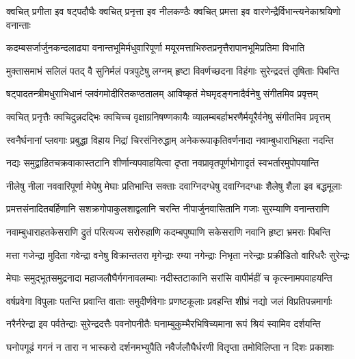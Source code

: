 \twolineshloka
{क्वचित् प्रगीता इव षट्पदौघैः क्वचित् प्रनृत्ता इव नीलकण्ठैः}
{क्वचित् प्रमत्ता इव वारणेन्द्रैर्विभान्त्यनेकाश्रयिणो वनान्ताः} %

\twolineshloka
{कदम्बसर्जार्जुनकन्दलाढ्या वनान्तभूमिर्मधुवारिपूर्णा}
{मयूरमत्ताभिरुतप्रनृत्तैरापानभूमिप्रतिमा विभाति} %

\twolineshloka
{मुक्तासमाभं सलिलं पतद् वै सुनिर्मलं पत्रपुटेषु लग्नम्}
{हृष्टा विवर्णच्छदना विहंगाः सुरेन्द्रदत्तं तृषिताः पिबन्ति} %

\twolineshloka
{षट्पादतन्त्रीमधुराभिधानं प्लवंगमोदीरितकण्ठतालम्}
{आविष्कृतं मेघमृदङ्गनादैर्वनेषु संगीतमिव प्रवृत्तम्} %

\twolineshloka
{क्वचित् प्रनृत्तैः क्वचिदुन्नदद्भिः क्वचिच्च वृक्षाग्रनिषण्णकायैः}
{व्यालम्बबर्हाभरणैर्मयूरैर्वनेषु संगीतमिव प्रवृत्तम्} %

\twolineshloka
{स्वनैर्घनानां प्लवगाः प्रबुद्धा विहाय निद्रां चिरसंनिरुद्धाम्}
{अनेकरूपाकृतिवर्णनादा नवाम्बुधाराभिहता नदन्ति} %

\twolineshloka
{नद्यः समुद्वाहितचक्रवाकास्तटानि शीर्णान्यपवाहयित्वा}
{दृप्ता नवप्रावृतपूर्णभोगादृतं स्वभर्तारमुपोपयान्ति} %

\twolineshloka
{नीलेषु नीला नववारिपूर्णा मेघेषु मेघाः प्रतिभान्ति सक्ताः}
{दवाग्निदग्धेषु दवाग्निदग्धाः शैलेषु शैला इव बद्धमूलाः} %

\twolineshloka
{प्रमत्तसंनादितबर्हिणानि सशक्रगोपाकुलशाद्वलानि}
{चरन्ति नीपार्जुनवासितानि गजाः सुरम्याणि वनान्तराणि} %

\twolineshloka
{नवाम्बुधाराहतकेसराणि द्रुतं परित्यज्य सरोरुहाणि}
{कदम्बपुष्पाणि सकेसराणि नवानि हृष्टा भ्रमराः पिबन्ति} %

\twolineshloka
{मत्ता गजेन्द्रा मुदिता गवेन्द्रा वनेषु विक्रान्ततरा मृगेन्द्राः}
{रम्या नगेन्द्राः निभृता नरेन्द्राः प्रक्रीडितो वारिधरैः सुरेन्द्रः} %

\twolineshloka
{मेघाः समुद्भूतसमुद्रनादा महाजलौघैर्गगनावलम्बाः}
{नदीस्तटाकानि सरांसि वापीर्महीं च कृत्स्नामपवाहयन्ति} %

\twolineshloka
{वर्षप्रवेगा विपुलाः पतन्ति प्रवान्ति वाताः समुदीर्णवेगाः}
{प्रणष्टकूलाः प्रवहन्ति शीघ्रं नद्यो जलं विप्रतिपन्नमार्गाः} %

\twolineshloka
{नरैर्नरेन्द्रा इव पर्वतेन्द्राः सुरेन्द्रदत्तैः पवनोपनीतैः}
{घनाम्बुकुम्भैरभिषिच्यमाना रूपं श्रियं स्वामिव दर्शयन्ति} %

\twolineshloka
{घनोपगूढं गगनं न तारा न भास्करो दर्शनमभ्युपैति}
{नवैर्जलौघैर्धरणी वितृप्ता तमोविलिप्ता न दिशः प्रकाशाः} %

